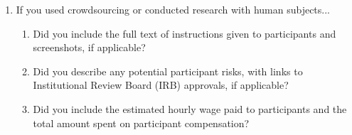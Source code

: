 \begin{enumerate}
\item If you used crowdsourcing or conducted research with human subjects...
\begin{enumerate}
  \item Did you include the full text of instructions given to participants and screenshots, if applicable?
  \item Did you describe any potential participant risks, with links to Institutional Review Board (IRB) approvals, if applicable?
  \item Did you include the estimated hourly wage paid to participants and the total amount spent on participant compensation?
\end{enumerate}

\end{enumerate}

